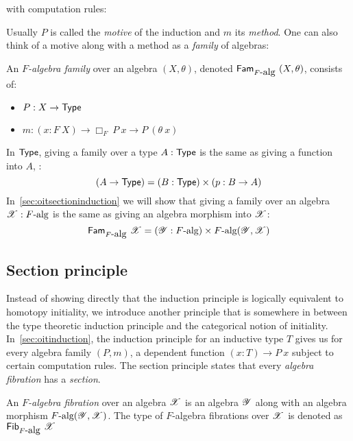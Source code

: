 \documentclass[a4paper,10pt]{article}
\begin{document}

with computation rules:


Usually $P$ is called the \emph{motive} of the induction and $m$ its
\emph{method}. One can also think of a motive along with a method as a
\emph{family} of algebras:

\begin{defn}
  An \emph{$F$-algebra family} over an algebra $(X,\theta)$, denoted
  $\mathsf{Fam}_{F\mbox{-alg}}\ (X,\theta)$, consists of:

  \begin{itemize}
  \item $P : X \to \mathsf{Type}$
  \item $m : (x : F\ X) \to \Box_F\ P\ x \to P\ (\theta\ x)$
  \end{itemize}
\end{defn}

In $\mathsf{Type}$, giving a family over a type $A : \mathsf{Type}$ is the same as
giving a function into $A$, \ie:
$$
(A \to \mathsf{Type}) = (B : \mathsf{Type}) \times (p : B \to A)
$$
In~\cref{sec:oitsectioninduction} we will show that giving a
family over an algebra $\mathscr{X} : F\mbox{-alg}$ is the same as giving an
algebra morphism into $\mathscr{X}$:
$$
\mathsf{Fam}_{F\mbox{-alg}}\ \mathscr{X} = (\mathscr{Y} : F\mbox{-alg}) \times F\mbox{-alg}(\mathscr{Y},\mathscr{X})
$$

\subsection{Section principle}
\label{sec:oitsection}

Instead of showing directly that the induction principle is logically
equivalent to homotopy initiality, we introduce another principle that
is somewhere in between the type theoretic induction principle and the
categorical notion of initiality. In~\cref{sec:oitinduction}, the
induction principle for an inductive type $T$ gives us for every
algebra family $(P,m)$, a dependent function $(x : T) \to P\ x$
subject to certain computation rules. The section principle states
that every \emph{algebra fibration} has a \emph{section}.

\begin{defn}
  An \emph{$F$-algebra fibration} over an algebra $\mathscr{X}$ is an
  algebra $\mathscr{Y}$ along with an algebra morphism
  $F\mbox{-alg}(\mathscr{Y},\mathscr{X})$. The type of $F$-algebra fibrations
  over $\mathscr{X}$ is denoted as $\mathsf{Fib}_{F\mbox{-alg}}\ \mathscr{X}$
\end{defn}
\end{document}
